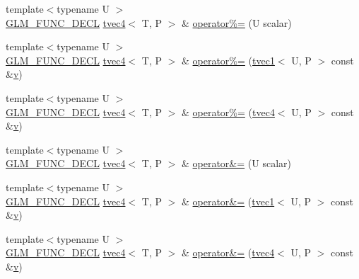 \begin{DoxyCompactItemize}
\item 
{\footnotesize template$<$typename U $>$ }\\\mbox{\hyperlink{setup_8hpp_ab2d052de21a70539923e9bcbf6e83a51}{G\+L\+M\+\_\+\+F\+U\+N\+C\+\_\+\+D\+E\+CL}} \mbox{\hyperlink{structglm_1_1tvec4}{tvec4}}$<$ T, P $>$ \& \mbox{\hyperlink{structglm_1_1tvec4_a02e8a331532d44e052509273241892df}{operator\%=}} (U scalar)
\item 
{\footnotesize template$<$typename U $>$ }\\\mbox{\hyperlink{setup_8hpp_ab2d052de21a70539923e9bcbf6e83a51}{G\+L\+M\+\_\+\+F\+U\+N\+C\+\_\+\+D\+E\+CL}} \mbox{\hyperlink{structglm_1_1tvec4}{tvec4}}$<$ T, P $>$ \& \mbox{\hyperlink{structglm_1_1tvec4_ac71d67fa398069e9899bf5c420b1cc72}{operator\%=}} (\mbox{\hyperlink{structglm_1_1tvec1}{tvec1}}$<$ U, P $>$ const \&\mbox{\hyperlink{glad_8h_a14cfbe2fc2234f5504618905b69d1e06}{v}})
\item 
{\footnotesize template$<$typename U $>$ }\\\mbox{\hyperlink{setup_8hpp_ab2d052de21a70539923e9bcbf6e83a51}{G\+L\+M\+\_\+\+F\+U\+N\+C\+\_\+\+D\+E\+CL}} \mbox{\hyperlink{structglm_1_1tvec4}{tvec4}}$<$ T, P $>$ \& \mbox{\hyperlink{structglm_1_1tvec4_ae741cd1a5b5495e3cfbefa2721f8c46f}{operator\%=}} (\mbox{\hyperlink{structglm_1_1tvec4}{tvec4}}$<$ U, P $>$ const \&\mbox{\hyperlink{glad_8h_a14cfbe2fc2234f5504618905b69d1e06}{v}})
\item 
{\footnotesize template$<$typename U $>$ }\\\mbox{\hyperlink{setup_8hpp_ab2d052de21a70539923e9bcbf6e83a51}{G\+L\+M\+\_\+\+F\+U\+N\+C\+\_\+\+D\+E\+CL}} \mbox{\hyperlink{structglm_1_1tvec4}{tvec4}}$<$ T, P $>$ \& \mbox{\hyperlink{structglm_1_1tvec4_abc33b1e793f785556faaf26a7396fd7e}{operator\&=}} (U scalar)
\item 
{\footnotesize template$<$typename U $>$ }\\\mbox{\hyperlink{setup_8hpp_ab2d052de21a70539923e9bcbf6e83a51}{G\+L\+M\+\_\+\+F\+U\+N\+C\+\_\+\+D\+E\+CL}} \mbox{\hyperlink{structglm_1_1tvec4}{tvec4}}$<$ T, P $>$ \& \mbox{\hyperlink{structglm_1_1tvec4_a26423766721ad3b6e63c412c0464cb20}{operator\&=}} (\mbox{\hyperlink{structglm_1_1tvec1}{tvec1}}$<$ U, P $>$ const \&\mbox{\hyperlink{glad_8h_a14cfbe2fc2234f5504618905b69d1e06}{v}})
\item 
{\footnotesize template$<$typename U $>$ }\\\mbox{\hyperlink{setup_8hpp_ab2d052de21a70539923e9bcbf6e83a51}{G\+L\+M\+\_\+\+F\+U\+N\+C\+\_\+\+D\+E\+CL}} \mbox{\hyperlink{structglm_1_1tvec4}{tvec4}}$<$ T, P $>$ \& \mbox{\hyperlink{structglm_1_1tvec4_af779a1c66977b5d31c269e46c9f59723}{operator\&=}} (\mbox{\hyperlink{structglm_1_1tvec4}{tvec4}}$<$ U, P $>$ const \&\mbox{\hyperlink{glad_8h_a14cfbe2fc2234f5504618905b69d1e06}{v}})

\end{DoxyCompactItemize}
